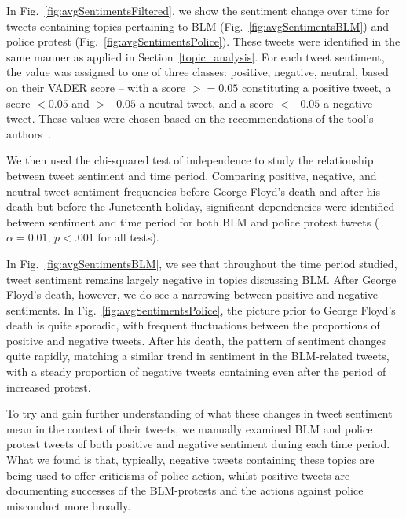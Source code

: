 \documentclass[letterpaper]{article}
\begin{document}
In Fig.~\ref{fig:avgSentimentsFiltered}, we show the sentiment change over time for tweets containing topics pertaining to BLM (Fig.~\ref{fig:avgSentimentsBLM}) and police protest (Fig.~\ref{fig:avgSentimentsPolice}). These tweets were identified in the same manner as applied in Section~\ref{topic_analysis}. For each tweet sentiment, the value was assigned to one of three classes: positive, negative, neutral, based on their VADER score -- with a score $>=0.05$ constituting a positive tweet, a score $<0.05$ and $>-0.05$ a neutral tweet, and a score $<-0.05$ a negative tweet. These values were chosen based on the recommendations of the tool's authors~\cite{Gilbert2014}.

We then used the chi-squared test of independence to study the relationship between tweet sentiment and time period. Comparing positive, negative, and neutral tweet sentiment frequencies before George Floyd's death and after his death but before the Juneteenth holiday, significant dependencies were identified between sentiment and time period for both BLM and police protest tweets ($\alpha=0.01$, $p<.001$ for all tests).

In Fig.~\ref{fig:avgSentimentsBLM}, we see that throughout the time period studied, tweet sentiment remains largely negative in topics discussing BLM. After George Floyd's death, however, we do see a narrowing between positive and negative sentiments. In Fig.~\ref{fig:avgSentimentsPolice}, the picture prior to George Floyd's death is quite sporadic, with frequent fluctuations between the proportions of positive and negative tweets. After his death, the pattern of sentiment changes quite rapidly, matching a similar trend in sentiment in the BLM-related tweets, with a steady proportion of negative tweets containing even after the period of increased protest.

To try and gain further understanding of what these changes in tweet sentiment mean in the context of their tweets, we manually examined BLM and police protest tweets of both positive and negative sentiment during each time period. What we found is that, typically, negative tweets containing these topics are being used to offer criticisms of police action, whilst positive tweets are documenting successes of the BLM-protests and the actions against police misconduct more broadly.
\end{document}

